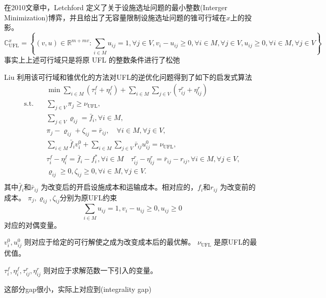 \documentclass[UTF8]{article}
\begin{document}
在2010文章中，Letchford 定义了关于设施选址问题的最小整数(Interger Minimization)博弈，并且给出了无容量限制设施选址问题的锥可行域在$x$上的投影。
\[
\mathbb{C}_{\mathrm{UFL}}^{x}=\left\{(v, u) \in \mathbb{R}^{m+m v}: \sum_{i \in M} u_{i j}=1, \forall j \in V, v_{i}-u_{i j} \geq 0, \forall i \in M, \forall j \in V, u_{i j} \geq 0, \forall i \in M, \forall j \in V\right\}
\]
事实上上述可行域只是将原 UFL 的整数条件进行了松弛

Liu 利用该可行域和锥优化的方法对UFL的逆优化问题得到了如下的启发式算法
\begin{equation}
\begin{aligned}
&\min \sum_{i \in M} \left(\tau_{i}^{f}+\eta_{i}^{f}\right)+\sum_{i \in M} \sum_{j \in V} \left(\tau_{i j}^r+\eta_{i j}^{r}\right) \\
\text{s.t.} \quad &\sum_{j \in V} \pi_{j} \geq \nu_{\mathrm{UFL}}, \\
&\sum_{j \in V} \varrho_{i j}=\bar{f}_{i}, \forall i \in M, \\
&\pi_{j}-\varrho_{i j}+\zeta_{i j}=\bar{r}_{i j}, \quad \forall i \in M, \forall j \in V, \\
&\sum_{i \in M} \bar{f}_{i} v_{i}^{0}+\sum_{i \in M} \sum_{j \in V} \bar{r}_{i j} u_{i j}^{0}=\nu_{\mathrm{UFL}}, \\
& \tau_{i}^{f}-\eta_{i}^{f}=\bar{f}_{i}-f_{i}^{*}, \forall i \in M \quad \tau_{i j}^{r}-\eta_{i j}^{r}=\bar{r}_{i j}-r_{i j}, \forall i \in M, \forall j \in V, \\
& \varrho_{i j} \geq 0, \zeta_{i j} \geq 0, \forall i \in M, \forall j \in V. \\
\end{aligned}
\end{equation}
其中$\bar{f}_{i}$和$\bar{r}_{ij}$ 为改变后的开启设施成本和运输成本。相对应的，$f_{i}$和$r_{ij}$ 为改变前的成本。
$\pi_{j},\varrho_{i j},\zeta_{i j}$分别为原UFL约束
\begin{equation*}
\sum_{i \in M} u_{ij} = 1,
v_i - u_{ij} \geq 0,
u_{ij} \geq 0
\end{equation*}
对应的对偶变量。 \par
$v_{i}^{0},u_{i j}^{0}$ 则对应于给定的可行解使之成为改变成本后的最优解。
$\nu_{\mathrm{UFL}}$ 是原UFL的最优值。

$\tau_{i}^{f},\eta_{i}^{f},\tau_{i j}^r,\eta_{i j}^{r}$ 则对应于求解范数一下引入的变量。 \par


这部分gap很小，实际上对应到(integrality gap)
\end{document}
